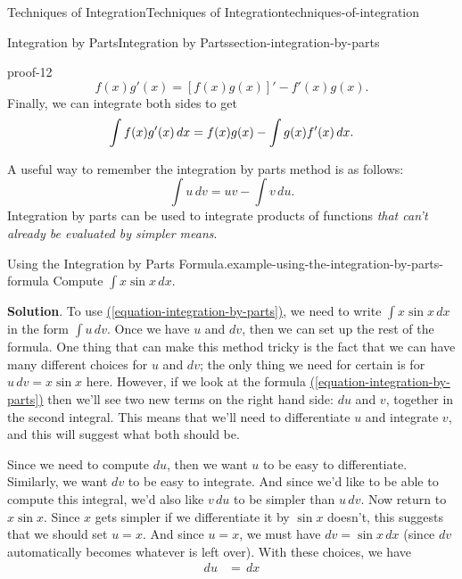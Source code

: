 \documentclass[oneside,10pt,]{book}
\renewcommand{\qedhere}{\relax}
\numberwithin{equation}{section}
\begin{document}
\begin{chapterptx}{Techniques of Integration}{}{Techniques of Integration}{}{}{techniques-of-integration}
\begin{sectionptx}{Integration by Parts}{}{Integration by Parts}{}{}{section-integration-by-parts}
\begin{proofptx}{}{proof-12}
\begin{equation*}
f(x)g'(x) = [f(x)g(x)]' - f'(x)g(x).
\end{equation*}
Finally, we can integrate both sides to get%
\begin{equation*}
\int f(x)g'(x)\,dx = f(x)g(x) - \int g(x)f'(x)\,dx.\qedhere
\end{equation*}
%
\end{proofptx}
\hypertarget{p-499}{}%
A useful way to remember the integration by parts method is as follows:%
\begin{equation}
\int u\,dv = uv - \int v\,du.\label{equation-integration-by-parts}
\end{equation}
Integration by parts can be used to integrate products of functions \emph{that can't already be evaluated by simpler means}.%
\begin{example}{Using the Integration by Parts Formula.}{example-using-the-integration-by-parts-formula}%
\hypertarget{p-500}{}%
Compute \(\int x\sin x\,dx\).%
\par\smallskip%
\noindent\textbf{Solution}.\hypertarget{solution-110}{}\quad%
\hypertarget{p-501}{}%
To use \hyperref[equation-integration-by-parts]{(\ref{equation-integration-by-parts})}, we need to write \(\int x\sin x\,dx\) in the form \(\int u\,dv\). Once we have \(u\) and \(dv\), then we can set up the rest of the formula. One thing that can make this method tricky is the fact that we can have many different choices for \(u\) and \(dv\); the only thing we need for certain is for \(u\,dv = x\sin x\) here. However, if we look at the formula \hyperref[equation-integration-by-parts]{(\ref{equation-integration-by-parts})} then we'll see two new terms on the right hand side: \(du\) and \(v\), together in the second integral. This means that we'll need to differentiate \(u\) and integrate \(v\), and this will suggest what both should be.%
\par
\hypertarget{p-502}{}%
Since we need to compute \(du\), then we want \(u\) to be easy to differentiate. Similarly, we want \(dv\) to be easy to integrate. And since we'd like to be able to compute this integral, we'd also like \(v\,du\) to be simpler than \(u\,dv\). Now return to \(x\sin x\). Since \(x\) gets simpler if we differentiate it by \(\sin x\) doesn't, this suggests that we should set \(u = x\). And since \(u = x\), we must have \(dv = \sin x\,dx\) (since \(dv\) automatically becomes whatever is left over). With these choices, we have%
%
\begin{align*}
du & = \,dx \\

\end{align*}
\end{example}
\end{sectionptx}
\end{chapterptx}
\end{document}
